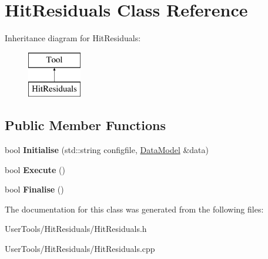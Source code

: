 \hypertarget{classHitResiduals}{\section{Hit\-Residuals Class Reference}
\label{classHitResiduals}
}
Inheritance diagram for Hit\-Residuals\-:\begin{figure}[H]
\begin{center}
\leavevmode
\includegraphics[height=2.000000cm]{classHitResiduals}
\end{center}
\end{figure}
\subsection*{Public Member Functions}
\begin{DoxyCompactItemize}
\item 
\hypertarget{classHitResiduals_ac37e7a71c2fece45c304383ace201de8}{bool {\bfseries Initialise} (std\-::string configfile, \hyperlink{classDataModel}{Data\-Model} \&data)}\label{classHitResiduals_ac37e7a71c2fece45c304383ace201de8}

\item 
\hypertarget{classHitResiduals_a6715e864b1c07e812178cc0d3b245339}{bool {\bfseries Execute} ()}\label{classHitResiduals_a6715e864b1c07e812178cc0d3b245339}

\item 
\hypertarget{classHitResiduals_a00c3b75308417bfd468cbb786104c26f}{bool {\bfseries Finalise} ()}\label{classHitResiduals_a00c3b75308417bfd468cbb786104c26f}

\end{DoxyCompactItemize}


The documentation for this class was generated from the following files\-:\begin{DoxyCompactItemize}
\item 
User\-Tools/\-Hit\-Residuals/Hit\-Residuals.\-h\item 
User\-Tools/\-Hit\-Residuals/Hit\-Residuals.\-cpp\end{DoxyCompactItemize}
